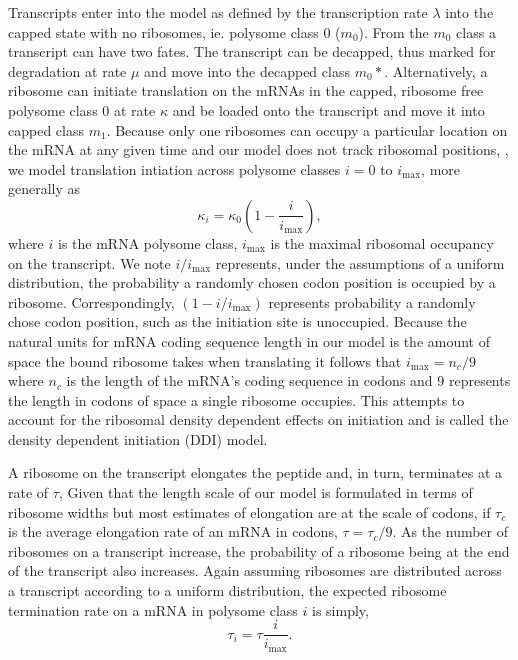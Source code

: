 \documentclass[a4,center,fleqn]{NAR}
\newcommand{\imax}{\ensuremath{{i_{\max}}}\xspace}
\begin{document}
Transcripts enter into the model as defined by the transcription rate $\lambda$ into the capped state with no ribosomes,  ie. polysome class 0 ($m_0$). 
From the $m_0$ class a transcript can have two fates. 
The transcript can be decapped, thus marked for degradation at rate $\mu$ and move into the decapped class $m_0*$.
Alternatively, a ribosome can initiate translation on the mRNAs in the capped, ribosome free polysome class 0 at rate $\kappa$ and be loaded onto the transcript and move it into capped class $m_1$.
Because only one ribosomes can occupy a particular location on the mRNA at any given time and our model does not track ribosomal positions,
, we model translation intiation across polysome classes $i = 0$ to $\imax$, more generally as
\begin{equation}
  \label{eq:kappa_i}
  \kappa_i = \kappa_0 \left(1- \frac{i}{\imax}\right),
\end{equation}
where $i$ is the mRNA polysome class, \imax is the maximal ribosomal occupancy on the transcript.
We note $i/\imax$ represents, under the assumptions of a uniform distribution,  the probability a randomly chosen codon position is occupied by a ribosome.
Correspondingly, $(1 - i/\imax)$ represents probability a randomly chose codon position, such as the initiation site is unoccupied.
Because the natural units for mRNA coding sequence length in our model is the amount of space the bound ribosome takes when translating it follows that $\imax = n_{c}/9$ where $n_{c}$ is the length of the mRNA's coding sequence in codons and 9 represents the length in codons of space a single ribosome occupies.
This attempts to account for the ribosomal density dependent effects on initiation and is called the density dependent initiation (DDI) model.


A ribosome on the transcript elongates the peptide and, in turn, terminates at a rate of $\tau$, 
Given that the length scale of our model is formulated in terms of ribosome widths but most estimates of elongation are at the scale of codons, if $\tau_c$ is the average elongation rate of an mRNA in codons, $\tau = \tau_c/9$.
As the number of ribosomes on a transcript increase, the probability of a ribosome being at the end of the transcript also increases.
Again assuming ribosomes are distributed across a transcript according to a uniform distribution, the expected ribosome termination rate on a mRNA in polysome class $i$ is simply, 
\begin{equation}
	\tau_i = \tau \frac{i}{\imax}.
\end{equation}
\end{document}
